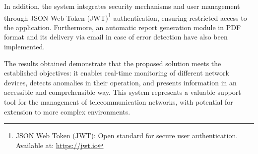 In addition, the system integrates security mechanisms and user management through JSON Web Token (JWT)\footnote{JSON Web Token (JWT): Open standard for secure user authentication. Available at: \url{https://jwt.io}} authentication, ensuring restricted access to the application. Furthermore, an automatic report generation module in PDF format and its delivery via email in case of error detection have also been implemented.  

The results obtained demonstrate that the proposed solution meets the established objectives: it enables real-time monitoring of different network devices, detects anomalies in their operation, and presents information in an accessible and comprehensible way. This system represents a valuable support tool for the management of telecommunication networks, with potential for extension to more complex environments.
